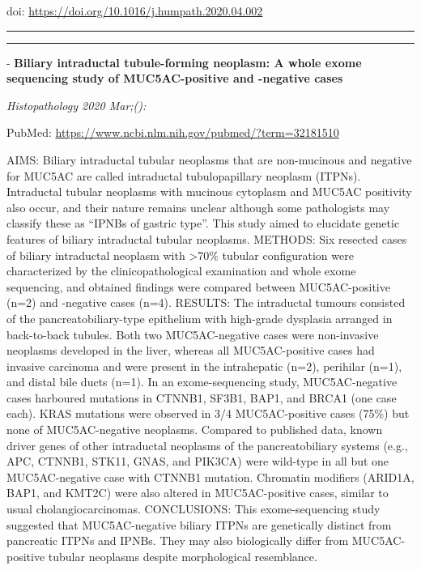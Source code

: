 \documentclass[
]{article}
\begin{document}
doi: \url{https://doi.org/10.1016/j.humpath.2020.04.002}

\begin{center}\rule{0.5\linewidth}{0.5pt}\end{center}

\begin{center}\rule{0.5\linewidth}{0.5pt}\end{center}

- \textbf{Biliary intraductal tubule-forming neoplasm: A whole exome
sequencing study of MUC5AC-positive and -negative cases}

\emph{Histopathology 2020 Mar;():}

PubMed: \url{https://www.ncbi.nlm.nih.gov/pubmed/?term=32181510}

AIMS: Biliary intraductal tubular neoplasms that are non-mucinous and
negative for MUC5AC are called intraductal tubulopapillary neoplasm
(ITPNs). Intraductal tubular neoplasms with mucinous cytoplasm and
MUC5AC positivity also occur, and their nature remains unclear although
some pathologists may classify these as ``IPNBs of gastric type''. This
study aimed to elucidate genetic features of biliary intraductal tubular
neoplasms. METHODS: Six resected cases of biliary intraductal neoplasm
with \textgreater70\% tubular configuration were characterized by the
clinicopathological examination and whole exome sequencing, and obtained
findings were compared between MUC5AC-positive (n=2) and -negative cases
(n=4). RESULTS: The intraductal tumours consisted of the
pancreatobiliary-type epithelium with high-grade dysplasia arranged in
back-to-back tubules. Both two MUC5AC-negative cases were non-invasive
neoplasms developed in the liver, whereas all MUC5AC-positive cases had
invasive carcinoma and were present in the intrahepatic (n=2), perihilar
(n=1), and distal bile ducts (n=1). In an exome-sequencing study,
MUC5AC-negative cases harboured mutations in CTNNB1, SF3B1, BAP1, and
BRCA1 (one case each). KRAS mutations were observed in 3/4
MUC5AC-positive cases (75\%) but none of MUC5AC-negative neoplasms.
Compared to published data, known driver genes of other intraductal
neoplasms of the pancreatobiliary systems (e.g., APC, CTNNB1, STK11,
GNAS, and PIK3CA) were wild-type in all but one MUC5AC-negative case
with CTNNB1 mutation. Chromatin modifiers (ARID1A, BAP1, and KMT2C) were
also altered in MUC5AC-positive cases, similar to usual
cholangiocarcinomas. CONCLUSIONS: This exome-sequencing study suggested
that MUC5AC-negative biliary ITPNs are genetically distinct from
pancreatic ITPNs and IPNBs. They may also biologically differ from
MUC5AC-positive tubular neoplasms despite morphological resemblance.
\end{document}
